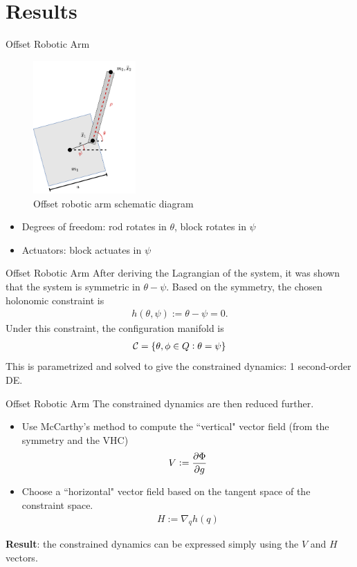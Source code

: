 \documentclass[xcolor=dvipsnames]{beamer}
\begin{document}
\section{Results}
\begin{frame}{Offset Robotic Arm}
\begin{figure}
    \centering
    \includegraphics[width=0.35\textwidth]{assets/robot-arm.png}
    \caption{Offset robotic arm schematic diagram}
    \label{fig:robarm}
\end{figure}
	\begin{itemize}
		\item Degrees of freedom: rod rotates in $\theta$, block rotates in $\psi$
		\item Actuators: block actuates in $\psi$
	\end{itemize}
\end{frame}

\begin{frame}{Offset Robotic Arm}
After deriving the Lagrangian of the system, it was shown that the system is symmetric in $\theta-\psi$. Based on the symmetry, the chosen holonomic constraint is
\begin{align}
    h(\theta,\psi):=\theta-\psi=0.
\end{align}
Under this constraint, the configuration manifold is
\begin{align}
     \mathcal{C}=\cbr{\theta,\phi\in Q:\theta=\psi}
\end{align}
This is parametrized and solved to give the constrained dynamics: 1 second-order DE. 
\end{frame}

\begin{frame}{Offset Robotic Arm}
The constrained dynamics are then reduced further.
\begin{itemize}
    \item Use McCarthy's method to compute the ``vertical" vector field (from the symmetry and the VHC)
    \begin{align}
        V:=\pdv{\Phi}{g}
    \end{align}
    \item Choose a ``horizontal" vector field based on the tangent space of the constraint space.
    \begin{align}
        H:=\nabla_q h(q)
    \end{align}
\end{itemize}
\textbf{Result}: the constrained dynamics can be expressed simply using the $V$ and $H$ vectors.
\end{frame}
\end{document}
